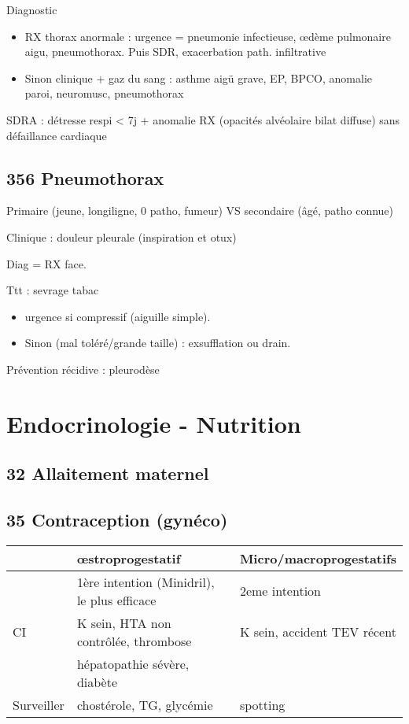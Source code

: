 \documentclass[11pt]{article}
\begin{document}
Diagnostic 
\begin{itemize}
\item RX thorax anormale : urgence = pneumonie infectieuse, \oe{}dème pulmonaire
aigu, pneumothorax. Puis SDR, exacerbation path. infiltrative
\item Sinon clinique + gaz du sang : asthme aigü grave, EP, BPCO, anomalie paroi,
neuromusc, pneumothorax
\end{itemize}

SDRA : détresse respi < 7j + anomalie RX (opacités alvéolaire bilat diffuse)
sans défaillance cardiaque
\subsection{356 Pneumothorax}
\label{sec:org4be9689}
Primaire (jeune, longiligne, 0 patho, fumeur) VS secondaire (âgé, patho connue)

Clinique : douleur pleurale (\inc inspiration et otux)

Diag = RX face.

Ttt : sevrage tabac
\begin{itemize}
\item urgence si compressif (aiguille simple).
\item Sinon (mal toléré/grande taille) : exsufflation ou drain.
\end{itemize}

Prévention récidive : pleurodèse 

\section{Endocrinologie - Nutrition}
\label{sec:org90fea6e}
\subsection{32 Allaitement maternel}
\label{sec:org38a3110}
\subsection{35 Contraception (gynéco)}
\label{sec:org2f54e3e}
\begin{center}
\begin{tabular}{lll}
 & \oe{}stroprogestatif & Micro/macroprogestatifs\\
\hline
 & 1ère intention (Minidril), le plus efficace & 2eme intention\\
CI & K sein, HTA non contrôlée, thrombose & K sein, accident TEV récent\\
 & hépatopathie sévère, diabète & \\
Surveiller & chostérole, TG, glycémie & spotting\\
\end{tabular}
\end{center}
\end{document}
